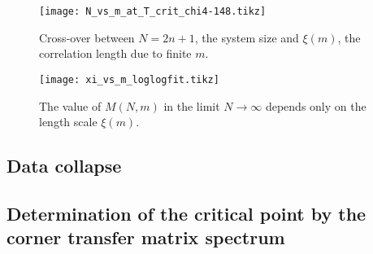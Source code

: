 
\begin{figure}
\texttt{[image: N\_vs\_m\_at\_T\_crit\_chi4-148.tikz]}
\caption{Cross-over between $N = 2n + 1$, the system size and $\xi(m)$, the correlation
length due to finite $m$.}
\label{fig:crossover}
\end{figure}

\begin{figure}
\texttt{[image: xi\_vs\_m\_loglogfit.tikz]}
\caption{The value of $M(N, m)$ in the limit $N \to \infty$ depends only on the length
scale $\xi(m)$.}
\label{fig:xi_vs_m_loglogfit}
\end{figure}

\subsection{Data collapse}

\subsection{Determination of the critical point by the corner transfer matrix spectrum}
